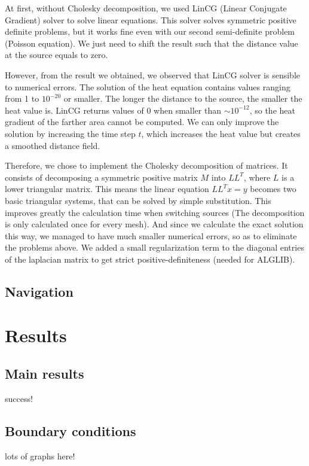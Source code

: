 \documentclass[a4paper,12pt,twoside]{article}
\begin{document}
At first, without Cholesky decomposition, we used LinCG (Linear Conjugate Gradient) solver to solve linear equations. This solver solves symmetric positive definite problems, but it works fine even with our second semi-definite problem (Poisson equation). We just need to shift the result such that the distance value at the source equals to zero.

However, from the result we obtained, we observed that LinCG solver is sensible to numerical errors. The solution of the heat equation contains values ranging from 1 to $10^{-20}$ or smaller. The longer the distance to the source, the smaller the heat value is. LinCG returns values of 0 when smaller than $\sim 10^{-12}$, so the heat gradient of the farther area cannot be computed. We can only improve the solution by increasing the time step $t$, which increases the heat value but creates a smoothed distance field.

Therefore, we chose to implement the Cholesky decomposition of matrices. It consists of decomposing a symmetric positive matrix $M$ into $LL^T$, where $L$ is a lower triangular matrix. This means the linear equation $LL^Tx = y$ becomes two basic triangular systems, that can be solved by simple substitution. This improves greatly the calculation time when switching sources (The decomposition is only calculated once for every mesh). And since we calculate the exact solution this way, we managed to have much smaller numerical errors, so as to eliminate the problems above. We added a small regularization term to the diagonal entries of the laplacian matrix to get strict positive-definiteness (needed for ALGLIB).

\subsection{Navigation}



\section{Results}

\subsection{Main results}
success!

\subsection{Boundary conditions}
lots of graphs here!
\end{document}
